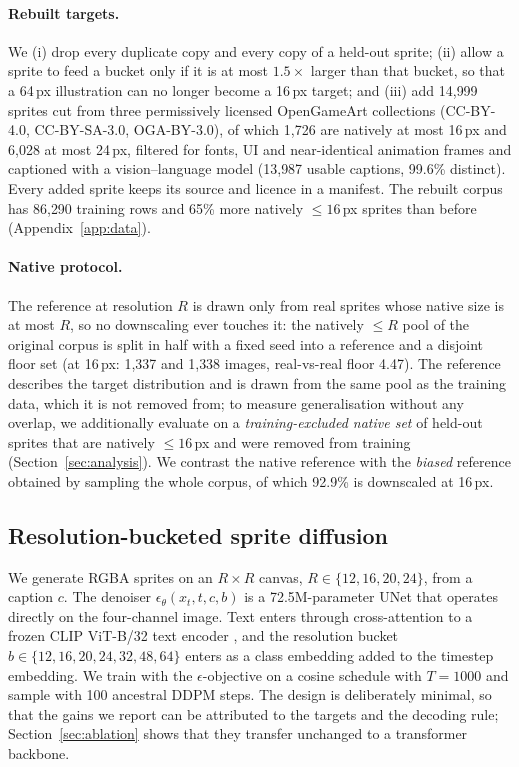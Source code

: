 \documentclass{article} %
\begin{document}
\paragraph{Rebuilt targets.}
We (i) drop every duplicate copy and every copy of a held-out sprite; (ii) allow a sprite to feed a bucket only if it is
at most $1.5\times$ larger than that bucket, so that a 64\,px illustration can no longer become a 16\,px target; and
(iii) add 14{,}999 sprites cut from three permissively licensed OpenGameArt collections (CC-BY-4.0, CC-BY-SA-3.0,
OGA-BY-3.0), of which 1{,}726 are natively at most 16\,px and 6{,}028 at most 24\,px, filtered for fonts, UI and
near-identical animation frames and captioned with a vision--language model (13{,}987 usable captions, 99.6\%
distinct). Every added sprite keeps its source and licence in a manifest. The
rebuilt corpus has 86{,}290 training rows and 65\% more natively $\le 16$\,px sprites than before
(Appendix~\ref{app:data}).

\paragraph{Native protocol.}
The reference at resolution $R$ is drawn only from real sprites whose native size is at most $R$, so no downscaling
ever touches it: the natively $\le R$ pool of the original corpus is split in half with a fixed seed into a reference
and a disjoint floor set (at 16\,px: 1{,}337 and 1{,}338 images, real-vs-real floor 4.47). The reference describes the
target distribution and is drawn from the same pool as the training data, which it is not removed from; to measure generalisation without any
overlap, we additionally evaluate on a \emph{training-excluded native set} of held-out sprites that are natively
$\le 16$\,px and were removed from training (Section~\ref{sec:analysis}). We contrast the native reference with the
\emph{biased} reference obtained by sampling the whole corpus, of which 92.9\% is downscaled at 16\,px.

\subsection{Resolution-bucketed sprite diffusion}
\label{sec:model}

We generate RGBA sprites on an $R\times R$ canvas, $R\in\{12,16,20,24\}$, from a caption $c$. The denoiser
$\epsilon_\theta(x_t,t,c,b)$ is a 72.5M-parameter UNet that operates directly on the four-channel image. Text enters
through cross-attention to a frozen CLIP ViT-B/32 text encoder \citep{Radford2021}, and the resolution bucket
$b\in\{12,16,20,24,32,48,64\}$ enters as a class embedding added to the timestep embedding. We train with the
$\epsilon$-objective \citep{Ho2020} on a cosine schedule with $T=1000$ and sample with 100 ancestral DDPM steps. The
design is deliberately minimal, so that the gains we report can be attributed to the targets and the decoding rule;
Section~\ref{sec:ablation} shows that they transfer unchanged to a transformer backbone.
\end{document}
